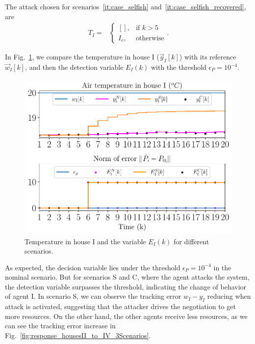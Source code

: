 \documentclass[../main.tex]{subfiles}
\begin{document}
The attack chosen for scenarios~\ref{it:case_selfish} and~\ref{it:case_selfish_recovered},
are
\begin{align}
  T_{I}=&\begin{cases}
          \left[\right],&\text{if }k> 5\\
          I_{c},&\text{otherwise}
        \end{cases}
.
\end{align}

In Fig.~\ref{fig:response_houseI_3Scenarios}, we compare the temperature in house I ($\vec{y}_{I}[k]$) with its reference $\vec{w}_{I}[k]$, and then the
detection variable ${E_{I}(k)}$ with the threshold
$\epsilon_{P}=10^{-4}$.

\begin{figure}[h]
  \centering
  \includegraphics[width=.7\textwidth]{../img/resilient_eq/ErrorWX_command_normErrH.pdf}
\caption{Temperature in house I and the variable $E_{I}(k)$ for different scenarios.}\label{fig:response_houseI_3Scenarios}
\end{figure}
As expected, the decision variable lies under the threshold $\epsilon_{P}=10^{-4}$ in the nominal scenario.
But for scenarios S and C, where the agent attacks the system, the detection variable surpasses the threshold, indicating the change of behavior of agent I.
In scenario S, we can observe the tracking error ${w_{I}-y_{I}}$ reducing when attack is activated, suggesting that the attacker drives the negotiation to get more resources.
On the other hand, the other agents receive less resources, as we can see the tracking error increase in Fig.~\ref{fig:response_housesII_to_IV_3Scenarios}.
\end{document}
